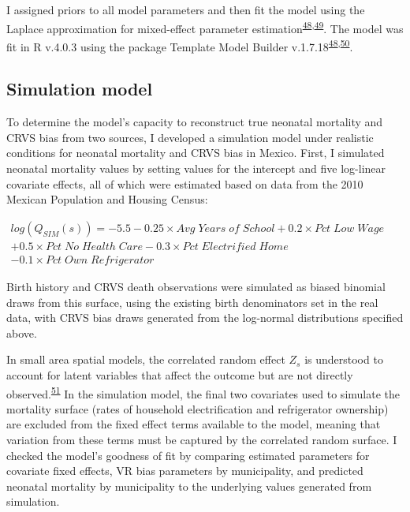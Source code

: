 \documentclass[
]{article}
\begin{document}
I assigned priors to all model parameters and then fit the model using the Laplace approximation for mixed-effect parameter estimation\textsuperscript{\protect\hyperlink{ref-Kristensen2016}{48},\protect\hyperlink{ref-Thorson2016}{49}}⁠. The model was fit in R v.4.0.3 using the package Template Model Builder v.1.7.18\textsuperscript{\protect\hyperlink{ref-Kristensen2016}{48},\protect\hyperlink{ref-RCoreTeam2018}{50}}.

\hypertarget{simulation-model}{%
\subsection{Simulation model}\label{simulation-model}}

To determine the model's capacity to reconstruct true neonatal mortality and CRVS bias from two sources, I developed a simulation model under realistic conditions for neonatal mortality and CRVS bias in Mexico. First, I simulated neonatal mortality values by setting values for the intercept and five log-linear covariate effects, all of which were estimated based on data from the 2010 Mexican Population and Housing Census:

\begin{math}\begin{aligned}
log(Q_{SIM}(s)) = -5.5 -0.25 \times Avg\;Years\;of\;School + 0.2 \times Pct\;Low\;Wage\\
+ 0.5 \times Pct\;No\;Health\;Care-0.3 \times Pct\;Electrified\;Home
\\- 0.1 \times Pct\;Own\;Refrigerator\;\;\;\;\;\;\;\;\;\;\;\;\;\;\;\;\;\;\;\;\;\;\;\;\;\;\;\;\;\;\;\;\;\;\;\;\;\;\;\;\;\;\;\;\;\;
\end{aligned}\end{math}

Birth history and CRVS death observations were simulated as biased binomial draws from this surface, using the existing birth denominators set in the real data, with CRVS bias draws generated from the log-normal distributions specified above.

In small area spatial models, the correlated random effect \(Z_s\) is understood to account for latent variables that affect the outcome but are not directly observed.\textsuperscript{\protect\hyperlink{ref-Divino2009}{51}} In the simulation model, the final two covariates used to simulate the mortality surface (rates of household electrification and refrigerator ownership) are excluded from the fixed effect terms available to the model, meaning that variation from these terms must be captured by the correlated random surface. I checked the model's goodness of fit by comparing estimated parameters for covariate fixed effects, VR bias parameters by municipality, and predicted neonatal mortality by municipality to the underlying values generated from simulation.
\end{document}

